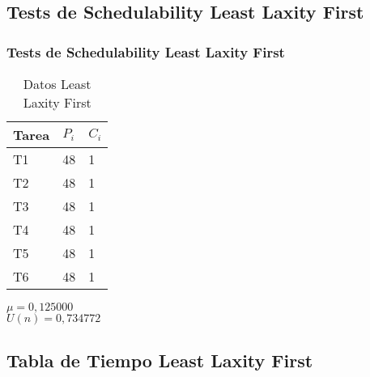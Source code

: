 \documentclass[xcolor=table]{beamer}
\begin{document}
\subsection{Tests de Schedulability  Least Laxity First } 

\begin{frame} 
\frametitle{Tests de Schedulability  Least Laxity First } 
\begin{table} 
\centering 
\begin{tabular}{|l|l|l|} 
\hline 
\cellcolor{lightgray}Tarea & \cellcolor{lightgray}$P_i$ & \cellcolor{lightgray}$C_i$ \\ \hline 
T1   & 48  &  1\\ \hline 
T2   & 48  &  1\\ \hline 
T3   & 48  &  1\\ \hline 
T4   & 48  &  1\\ \hline 
T5   & 48  &  1\\ \hline 
T6   & 48  &  1\\ \hline 
\end{tabular} 
\caption{Datos  Least Laxity First } 
\end{table} 
$\mu =  0,125000 $ \\ 
$U(n) =  0,734772 $ \\ 
\end{frame} 

\subsection{Tabla de Tiempo  Least Laxity First } 
\end{document}
